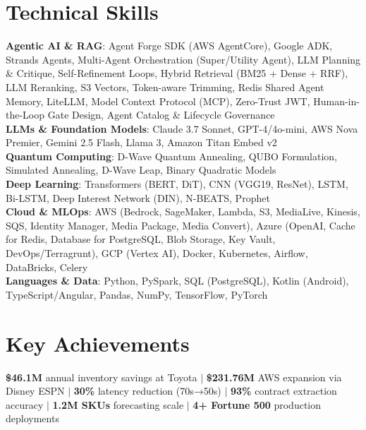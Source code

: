 \documentclass[letterpaper,10pt]{article}
\begin{document}
\section{Technical Skills}
 \begin{itemize}[leftmargin=0.15in, label={}]
    \small{\item{
     \textbf{Agentic AI \& RAG}{: Agent Forge SDK (AWS AgentCore), Google ADK, Strands Agents, Multi-Agent Orchestration (Super/Utility Agent), LLM Planning \& Critique, Self-Refinement Loops, Hybrid Retrieval (BM25 + Dense + RRF), LLM Reranking, S3 Vectors, Token-aware Trimming, Redis Shared Agent Memory, LiteLLM, Model Context Protocol (MCP), Zero-Trust JWT, Human-in-the-Loop Gate Design, Agent Catalog \& Lifecycle Governance} \\
     \textbf{LLMs \& Foundation Models}{: Claude 3.7 Sonnet, GPT-4/4o-mini, AWS Nova Premier, Gemini 2.5 Flash, Llama 3, Amazon Titan Embed v2} \\
     \textbf{Quantum Computing}{: D-Wave Quantum Annealing, QUBO Formulation, Simulated Annealing, D-Wave Leap, Binary Quadratic Models} \\
     \textbf{Deep Learning}{: Transformers (BERT, DiT), CNN (VGG19, ResNet), LSTM, Bi-LSTM, Deep Interest Network (DIN), N-BEATS, Prophet} \\
     \textbf{Cloud \& MLOps}{: AWS (Bedrock, SageMaker, Lambda, S3, MediaLive, Kinesis, SQS, Identity Manager, Media Package, Media Convert), Azure (OpenAI, Cache for Redis, Database for PostgreSQL, Blob Storage, Key Vault, DevOps/Terragrunt), GCP (Vertex AI), Docker, Kubernetes, Airflow, DataBricks, Celery} \\
     \textbf{Languages \& Data}{: Python, PySpark, SQL (PostgreSQL), Kotlin (Android), TypeScript/Angular, Pandas, NumPy, TensorFlow, PyTorch}
    }}
 \end{itemize}


\section{Key Achievements}
 \begin{itemize}[leftmargin=0.15in, label={}]
    \small{\item{
     \textbf{\$46.1M} annual inventory savings at Toyota $|$ 
     \textbf{\$231.76M} AWS expansion via Disney ESPN $|$ 
     \textbf{30\%} latency reduction (70s→50s) $|$ 
     \textbf{93\%} contract extraction accuracy $|$ 
     \textbf{1.2M SKUs} forecasting scale $|$ 
     \textbf{4+ Fortune 500} production deployments
    }}
 \end{itemize}


\end{document}
